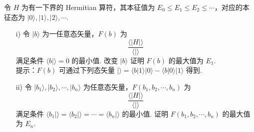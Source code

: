 \documentclass{assignment}
\begin{document}
\begin{prob}
    令 $H$ 为有一下界的 Hermitian 算符，其本征值为 $E_0\leq E_1\leq E_2\leq\cdots$，对应的本征态为 $\lvert 0\rangle,\lvert 1\rangle,\lvert 2\rangle,\cdots$.
    \begin{itemize}
        \item[i)] 令 $\lvert b\rangle$ 为一任意态矢量，$F(b)$ 为
        \[
            \frac{\langle\rvert H\lvert\rangle}{\langle\vert\rangle}
        \]
        满足条件 $\langle b\vert\rangle=0$ 的最小值. 改变 $\lvert b\rangle$ 证明 $F(b)$ 的最大值为 $E_1$.\\
        提示：$F(b)$ 可通过下列态矢量 $\lvert\rangle=\langle b\vert 1\rangle\lvert 0\rangle-\langle b\vert 0\rangle\lvert 1\rangle$ 得到.
        \item[ii)] 令 $\lvert b_1\rangle,\lvert b_2\rangle,\cdots,\lvert b_n\rangle$ 为任意态矢量，$F(b_1,b_2,\cdots,b_n)$ 为
        \[
            \frac{\langle\rvert H\lvert\rangle}{\langle\vert\rangle}
        \]
        满足条件 $\langle b_1\vert\rangle=\langle b_2\vert\rangle=\cdots=\langle b_n\vert\rangle$ 的最小值. 证明 $F(b_1,b_2,\cdots,b_n)$ 的最大值为 $E_n$.
    \end{itemize}
\end{prob}
\begin{sol}
    
\end{sol}
\end{document}

